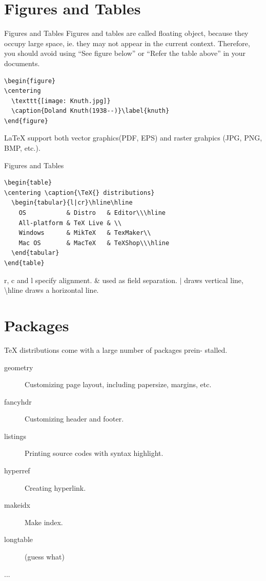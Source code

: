 \documentclass[10pt]{beamer}
\begin{document}
\section{Figures and Tables}
\begin{frame}[fragile]{Figures and Tables}
    Figures and tables are called floating object, because they occupy
    large space, ie. they may not appear in the current context.
    Therefore, you should avoid using ``See figure below'' or
    ``Refer the table above'' in your documents.

\begin{verbatim}
\begin{figure}
\centering
  \texttt{[image: Knuth.jpg]}
  \caption{Doland Knuth(1938--)}\label{knuth}
\end{figure}
\end{verbatim}

    \LaTeX{} support both vector graphics(PDF, EPS) and raster grahpics
    (JPG, PNG, BMP, etc.).

\end{frame}

\begin{frame}[fragile]{Figures and Tables}
\begin{verbatim}
\begin{table}
\centering \caption{\TeX{} distributions}
  \begin{tabular}{l|cr}\hline\hline
    OS           & Distro   & Editor\\\hline
    All-platform & TeX Live & \\
    Windows      & MikTeX   & TexMaker\\
    Mac OS       & MacTeX   & TeXShop\\\hline
  \end{tabular}
\end{table}
\end{verbatim}
    \alert{r}, \alert{c} and \alert{l} specify alignment.
    \alert{\&} used as field separation. \alert{$|$} draws vertical
    line, \alert{\textbackslash hline} draws a horizontal line.
\end{frame}

\section{Packages}
\begin{frame}
    \TeX{} distributions come with a large number of packages prein-
    stalled.
\begin{description}
    \item [geometry] Customizing page layout, including papersize,
        margins, etc.
    \item [fancyhdr] Customizing header and footer.
    \item [listings] Printing source codes with syntax highlight.
    \item [hyperref] Creating hyperlink.
    \item [makeidx] Make index.
    \item [longtable] (guess what)
    \item [...]
\end{description}
\end{frame}
\end{document}

